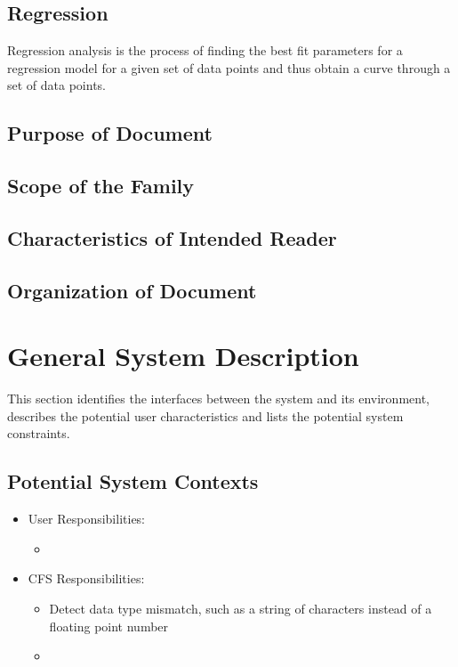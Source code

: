\documentclass[12pt]{article}
\newcommand{\famname}{CFS} %
\begin{document}
\subsection{Regression}
Regression analysis is the process of finding the best fit parameters for a regression model for a given set of data points and thus obtain a curve through a set of data points. \\ 






\subsection{Purpose of Document}


\subsection{Scope of the Family} 

\subsection{Characteristics of Intended Reader} 

\subsection{Organization of Document}

\section{General System Description}

This section identifies the interfaces between the system and its environment,
describes the potential user characteristics and lists the potential system
constraints.

\subsection{Potential System Contexts}


\begin{itemize}
\item User Responsibilities:
\begin{itemize}
\item 
\end{itemize}
\item \famname{} Responsibilities:
\begin{itemize}
\item Detect data type mismatch, such as a string of characters instead of a
  floating point number
\item 
\end{itemize}
\end{itemize}
\end{document}
